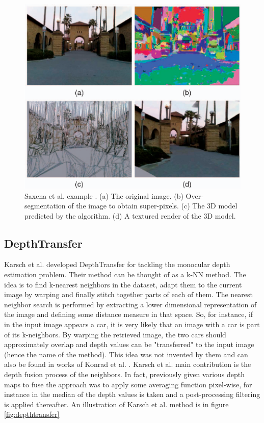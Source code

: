 \begin{figure}
	\centering
	\includegraphics[scale=0.4]{figs/saxena}
	\caption{Saxena et al. example \cite{saxena5}. (a) The original image. (b) Over-segmentation of the image to obtain super-pixels. (c) The 3D model predicted by the algorithm. (d) A textured render of the 3D model. \label{fig:saxena}}
\end{figure}

\subsection{DepthTransfer}
Karsch et al. \cite{DepthTransfer} developed DepthTransfer for tackling the monocular depth estimation problem.
Their method can be thought of as a k-NN method.
The idea is to find k-nearest neighbors in the dataset, adapt them to the current image by warping and finally stitch together parts of each of them.
The nearest neighbor search is performed by extracting a lower dimensional representation of the image and defining some distance measure in that space.
So, for instance, if in the input image appears a car, it is very likely that an image with a car is part of its k-neighbors.
By warping the retrieved image, the two cars should approximately overlap and depth values can be "transferred" to the input image (hence the name of the method).
This idea was not invented by them and can also be found in works of Konrad et al. \cite{konrad1, konrad2}.
Karsch et al. main contribution is the depth fusion process of the neighbors.
In fact, previously given various depth maps to fuse the approach was to apply some averaging function pixel-wise, for instance in \cite{konrad2} the median of the depth values is taken and a post-processing filtering is applied thereafter.
An illustration of Karsch et al. method is in figure \ref{fig:depthtransfer}


